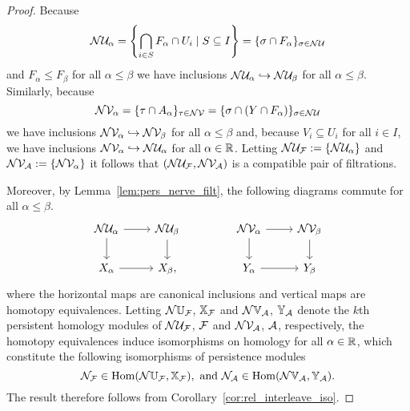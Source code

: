 \begin{proof}
  Because
  \[\mathcal{N}\mathcal{U}_\alpha = \left\{\bigcap_{i\in S} F_\alpha\cap U_i\mid S\subseteq I\right\} = \{\sigma\cap F_\alpha\}_{\sigma\in \mathcal{N}\mathcal{U}}\]
  and $F_\alpha\leq F_\beta$ for all $\alpha\leq\beta$ we have inclusions $\mathcal{N}\mathcal{U}_\alpha\hookrightarrow\mathcal{N}\mathcal{U}_\beta$ for all $\alpha\leq\beta$.
  Similarly, because
  \[\mathcal{N}\mathcal{V}_\alpha = \{\tau\cap A_\alpha\}_{\tau\in \mathcal{N}\mathcal{V}} = \{\sigma\cap (Y\cap F_\alpha)\}_{\sigma\in\mathcal{N}\mathcal{U}}\]
  we have inclusions $\mathcal{N}\mathcal{V}_\alpha\hookrightarrow\mathcal{N}\mathcal{V}_\beta$ for all $\alpha\leq\beta$ and, because $V_i\subseteq U_i$ for all $i\in I$, we have inclusions $\mathcal{N}\mathcal{V}_\alpha\hookrightarrow \mathcal{N}\mathcal{U}_\alpha$ for all $\alpha\in\mathbb{R}$.
  Letting $\mathcal{N}\mathcal{U}_{\mathcal{F}} := \{\mathcal{N}\mathcal{U}_\alpha\}$ and $\mathcal{N}\mathcal{V}_{\mathcal{A}} := \{\mathcal{N}\mathcal{V}_\alpha\}$ it follows that $(\mathcal{N}\mathcal{U}_{\mathcal{F}}, \mathcal{N}\mathcal{V}_{\mathcal{A}})$ is a compatible pair of filtrations.

  Moreover, by Lemma~\ref{lem:pers_nerve_filt}, the following diagrams commute for all $\alpha\leq\beta$.
  \[\begin{tikzcd}
      \N\cU_\alpha \arrow{r}\arrow{d} &
      \N\cU_\beta \arrow{d}\\
      X_\alpha\arrow{r} &
      X_\beta,
    \end{tikzcd}\hspace{10ex}
    \begin{tikzcd}
      \N\cV_\alpha \arrow{r}\arrow{d} &
      \N\cV_\beta \arrow{d}\\
      Y_\alpha\arrow{r} &
      Y_\beta
    \end{tikzcd}\]
  where the horizontal maps are canonical inclusions and vertical maps are homotopy equivalences.
  Letting $\mathcal{N}\mathbb{U}_{\mathcal{F}}$, $\mathbb{X}_{\mathcal{F}}$ and $\mathcal{N}\mathbb{V}_{\mathcal{A}}$, $\mathbb{Y}_{\mathcal{A}}$ denote the $k$th persistent homology modules of $\mathcal{N}\mathcal{U}_{\mathcal{F}}$, $\mathcal{F}$ and $\mathcal{N}\mathcal{V}_{\mathcal{A}}$, $\mathcal{A}$, respectively, the homotopy equivalences induce isomorphisms on homology for all $\alpha\in\mathbb{R}$, which constitute the following isomorphisms of persistence modules
  \[ \mathcal{N}_{\mathcal{F}}\in\mathrm{Hom}(\mathcal{N}\mathbb{U}_{\mathcal{F}}, \mathbb{X}_{\mathcal{F}}),\text{ and } \mathcal{N}_{\mathcal{A}}\in\mathrm{Hom}(\mathcal{N}\mathbb{V}_{\mathcal{A}},\mathbb{Y}_{\mathcal{A}}).\]
  The result therefore follows from Corollary~\ref{cor:rel_interleave_iso}.
\end{proof}

